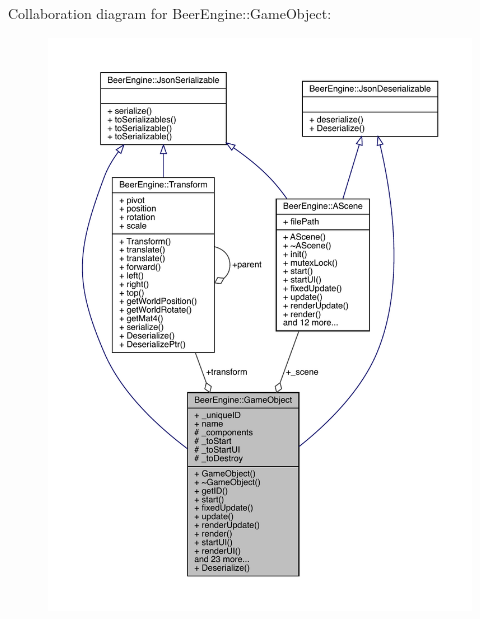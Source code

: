 Collaboration diagram for Beer\+Engine\+:\+:Game\+Object\+:
\nopagebreak
\begin{figure}[H]
\begin{center}
\leavevmode
\includegraphics[width=350pt]{class_beer_engine_1_1_game_object__coll__graph}
\end{center}
\end{figure}
